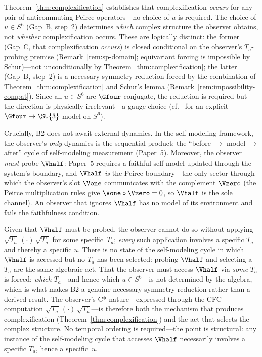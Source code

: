 \begin{remark}
\label{rem:C-vs-B2}
Theorem~\ref{thm:complexification} establishes that complexification
\emph{occurs} for any pair of anticommuting Peirce operators---no
choice of $u$ is required.  The choice of $u \in S^6$ (Gap~B,
step~2) determines \emph{which} complex structure the observer
obtains, not \emph{whether} complexification occurs.  These are
logically distinct: the former (Gap~C, that complexification \emph{occurs}) is closed conditional on the observer's $T_a$-probing premise (Remark~\ref{rem:sp-domain}; equivariant forcing is impossible by Schur)---not unconditionally
by Theorem~\ref{thm:complexification}; the latter (Gap~B, step~2)
is a necessary symmetry reduction forced by the combination of
Theorem~\ref{thm:complexification} and Schur's lemma
(Remark~\ref{rem:impossibility-compat}).  Since all
$u \in S^6$ are $\Gfour$-conjugate, the reduction is required but
the direction is physically irrelevant---a gauge choice
(cf.~\cite{FerraraEtAl2021} for an explicit $\Gfour\to\SU{3}$
model on $S^6$).

Crucially, B2 does not await external dynamics.  In the self-modeling
framework, the observer's \emph{only} dynamics is the sequential
product: the ``before $\to$ model $\to$ after'' cycle of
self-modeling measurement (Paper~5).  Moreover, the observer
\emph{must} probe $\Vhalf$: Paper~5 requires a faithful self-model
updated through the system's boundary, and $\Vhalf$ \emph{is} the
Peirce boundary---the only sector through which the observer's slot
$\Vone$ communicates with the complement $\Vzero$ (the Peirce
multiplication rules give $\Vone\circ\Vzero = 0$, so
$\Vhalf$ is the sole channel).  An observer that ignores $\Vhalf$
has no model of its environment and fails the faithfulness condition.

Given that $\Vhalf$ must be probed, the observer cannot do so
without applying $\sqrt{T_a}\,(\cdot)\,\sqrt{T_a}$ for
some specific~$T_a$; \emph{every} such application involves a
specific $T_a$ and thereby a specific $u$.  There is no state of the
self-modeling cycle in which $\Vhalf$ is accessed but no $T_a$ has
been selected: probing $\Vhalf$ and selecting a $T_a$ are the same
algebraic act.  That the observer must access $\Vhalf$ via
\emph{some} $T_a$ is forced; \emph{which} $T_a$---and hence which
$u \in S^6$---is not determined by the algebra, which is what makes
B2 a genuine necessary symmetry reduction rather than a
derived result.  The observer's C*-nature---expressed through the CFC computation
$\sqrt{T_a}\,(\cdot)\,\sqrt{T_a}$---is therefore both the
mechanism that produces complexification
(Theorem~\ref{thm:complexification}) and the act that selects the
complex structure.  No temporal ordering is required---the point is
structural: any instance of the self-modeling cycle that accesses
$\Vhalf$ necessarily involves a specific $T_a$, hence a
specific~$u$.
\end{remark}

